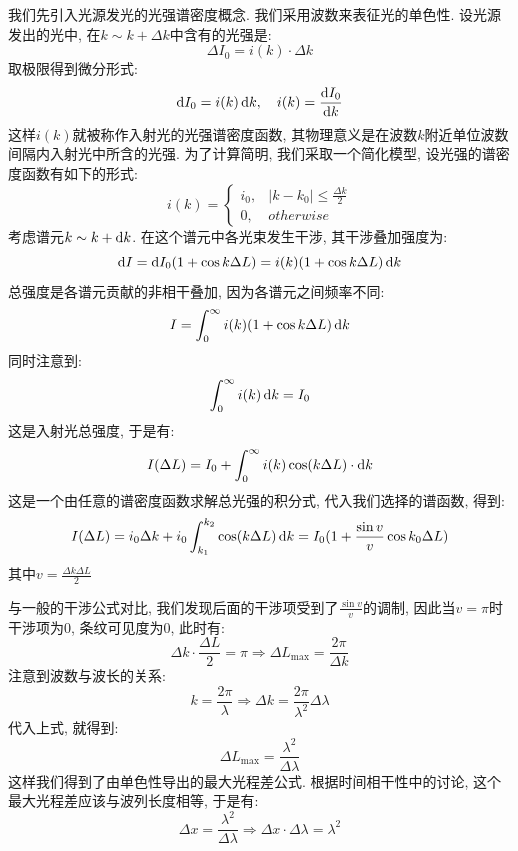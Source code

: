 \begin{noteenv}
    我们先引入光源发光的光强谱密度概念. 我们采用波数来表征光的单色性. 设光源发出的光中, 在$k \sim k+\Delta k$中含有的光强是:
    \[
    \Delta I_0 = i(k)\cdot \Delta k
    \]
    取极限得到微分形式:
    \[
    \mathop{}\!\mathrm{d} I_0 = i(k)\mathop{}\!\mathrm{d} k, \quad i(k)= \frac{\mathop{}\!\mathrm{d} I_0}{\mathop{}\!\mathrm{d} k}
    \]
    这样$i(k)$就被称作入射光的光强谱密度函数, 其物理意义是在波数$k$附近单位波数间隔内入射光中所含的光强. 为了计算简明, 我们采取一个简化模型, 设光强的谱密度函数有如下的形式:
    \[
    i(k)=
    \begin{cases}
    i_0, & |k-k_0|\le \frac{\Delta k}{2} \\
    0, & otherwise
    \end{cases}
    \]
    考虑谱元$k \sim k+\mathop{}\!\mathrm{d} k$. 在这个谱元中各光束发生干涉, 其干涉叠加强度为:
    \[
    \mathop{}\!\mathrm{d} I = \mathop{}\!\mathrm{d} I_0 (1+\cos k\Delta L)=i(k)(1+\cos k\Delta L)\mathop{}\!\mathrm{d} k
    \]
    总强度是各谱元贡献的非相干叠加, 因为各谱元之间频率不同:
    \[
    I = \int_0^{\infty}i(k)(1+\cos k \Delta L)\mathop{}\!\mathrm{d} k
    \]
    同时注意到:
    \[
    \int_0^{\infty} i(k)\mathop{}\!\mathrm{d} k = I_0
    \]
    这是入射光总强度, 于是有:
    \[
    I(\Delta L) = I_0+\int_0^{\infty}i(k)\cos (k\Delta L)\cdot \mathop{}\!\mathrm{d} k
    \]
    这是一个由任意的谱密度函数求解总光强的积分式, 代入我们选择的谱函数, 得到:
    \[
    I(\Delta L)=i_0\Delta k+i_0\int_{k_1}^{k_2}\cos (k \Delta L)\mathop{}\!\mathrm{d} k = I_0(1+\frac{\sin v}{v}\cos k_0 \Delta L)
    \]
    其中$v =\frac{\Delta k\Delta L}{2}$

    与一般的干涉公式对比, 我们发现后面的干涉项受到了$\frac{\sin v}{v}$的调制, 因此当$v = \pi$时干涉项为$0$, 条纹可见度为$0$, 此时有:
    \[
    \Delta k \cdot \frac{\Delta L}{2} = \pi \Rightarrow \Delta L_{\max} = \frac{2\pi}{\Delta k}
    \]
    注意到波数与波长的关系:
    \[
    k = \frac{2\pi}{\lambda} \Rightarrow \Delta k = \frac{2\pi}{\lambda^2}\Delta \lambda
    \]
    代入上式, 就得到:
    \[
    \Delta L_{\max} = \frac{\lambda^2}{\Delta \lambda}
    \]
    这样我们得到了由单色性导出的最大光程差公式. 根据时间相干性中的讨论, 这个最大光程差应该与波列长度相等, 于是有:
    \[
    \Delta x =\frac{\lambda^2}{\Delta \lambda} \Rightarrow \Delta x \cdot \Delta \lambda = \lambda^2
    \]
\end{noteenv}

